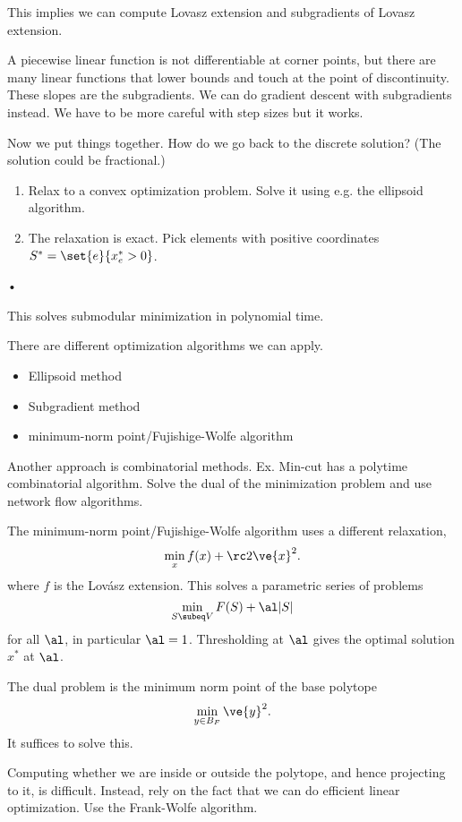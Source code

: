This implies we can compute Lovasz extension and subgradients of Lovasz extension.

A piecewise linear function is not differentiable at corner points, but there are many linear functions that lower bounds and touch at the point of discontinuity. These slopes are the subgradients. We can do gradient descent with subgradients instead. We have to be more careful with step sizes but it works.

Now we put things together. How do we go back to the discrete solution? (The solution could be fractional.)
\begin{alg}
\begin{enumerate}
\item
Relax to a convex optimization problem. Solve it using e.g. the ellipsoid algorithm.
\item
The relaxation is exact. Pick elements with positive coordinates $S^*=\set{e}{x_e^*>0}$.
\end{enumerate}•
\end{alg}
This solves submodular minimization in polynomial time.

There are different optimization algorithms we can apply.
\begin{itemize}
\item
Ellipsoid method
\item
Subgradient method
\item
minimum-norm point/Fujishige-Wolfe algorithm
\end{itemize}
Another approach is combinatorial methods. Ex. Min-cut has a polytime combinatorial algorithm. Solve the dual of the minimization problem and use network flow algorithms.



The minimum-norm point/Fujishige-Wolfe algorithm uses a different relaxation,
$$
\min_x f(x) + \rc 2\ve{x}^2.
$$
where $f$ is the Lov\'asz extension.
This solves a parametric series of problems
$$\min_{S\subeq V}F(S)+\al|S|$$ for all $\al$, in particular $\al=1$. 
Thresholding at $\al$ gives the optimal solution $x^*$ at $\al$.

The dual problem is the minimum norm point of the base polytope
$$
\min_{y\in B_F}\ve{y}^2.
$$
It suffices to solve this.

Computing whether we are inside or outside the polytope, and hence projecting to it, is difficult. Instead, rely on the fact that we can do efficient linear optimization. Use %
the Frank-Wolfe algorithm.

